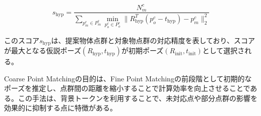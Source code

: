 \[
s_{\text{hyp}} = \frac{N_m^c}{\sum_{p_m^c \in P_m^c} \min_{p_o^c \in P_o^c} \| R_{\text{hyp}}^T (p_o^c - t_{\text{hyp}}) - p_m^c \|_2^2 }
\]

このスコア$s_{\text{hyp}}$は、提案物体点群と対象物点群の対応精度を表しており、スコアが最大となる仮説ポーズ$(R_{\text{hyp}}, t_{\text{hyp}})$が初期ポーズ$(R_{\text{init}}, t_{\text{init}})$として選択される。

Coarse Point Matchingの目的は、Fine Point Matchingの前段階として初期的なポーズを推定し、点群間の距離を縮小することで計算効率を向上させることである。この手法は、背景トークンを利用することで、未対応点や部分点群の影響を効果的に抑制する点に特徴がある。
















